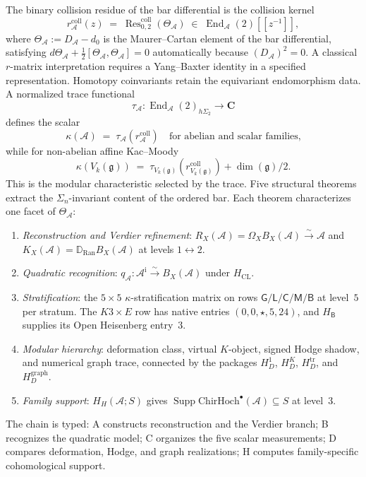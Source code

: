 \documentclass[11pt]{article}
\theoremstyle{plain}
\theoremstyle{definition}
\theoremstyle{remark}
\newcommand{\fg}{\mathfrak{g}}
\newcommand{\Ran}{\mathrm{Ran}}
\newcommand{\cA}{\mathcal{A}}
\newcommand{\Res}{\operatorname{Res}}
\newcommand{\ChirHoch}{\mathrm{ChirHoch}}
\begin{document}
The binary collision residue of the bar differential is the collision
kernel
\[
r^{\mathrm{coll}}_\cA(z) \;=\;
\Res^{\mathrm{coll}}_{0,2}(\Theta_\cA)
\;\in\; \operatorname{End}_\cA(2)[\![z^{-1}]\!],
\]
where $\Theta_\cA := D_\cA - d_0$ is the Maurer--Cartan element
of the bar differential, satisfying
$d\Theta_\cA + \tfrac{1}{2}[\Theta_\cA, \Theta_\cA] = 0$
automatically because $(D_\cA)^2 = 0$.  A classical $r$-matrix
interpretation requires a Yang--Baxter identity in a specified
representation.  Homotopy coinvariants retain the equivariant
endomorphism data.  A normalized trace functional
\[
 \tau_\cA\colon
 \operatorname{End}_\cA(2)_{h\Sigma_2}\longrightarrow\mathbf C
\]
defines the scalar
\begin{equation}\label{eq:kappa-def}
\kappa(\cA) \;=\; \tau_\cA(r^{\mathrm{coll}}_\cA)
\quad \text{for abelian and scalar families,}
\end{equation}
while for non-abelian affine Kac--Moody
\[
\kappa(V_k(\fg))
\;=\;\tau_{V_k(\fg)}(r^{\mathrm{coll}}_{V_k(\fg)})
      +\dim(\fg)/2.
\]
This is the modular characteristic selected by the trace. Five
structural theorems extract the
$\Sigma_n$-invariant content of the ordered bar. Each theorem
characterizes one facet of $\Theta_\cA$:
\begin{enumerate}[label=\textup{(\Alph*)}]
\item \emph{Reconstruction and Verdier refinement}:
 $R_X(\cA)=\Omega_XB_X(\cA)\xrightarrow{\sim}\cA$ and
 $K_X(\cA)=\mathbb D_{\Ran}B_X(\cA)$ at levels
 $1\leftrightarrow2$.
\item \emph{Quadratic recognition}:
 $q_\cA\colon\cA^{\mathrm i}\xrightarrow{\sim}B_X(\cA)$ under
 $H_{\mathrm{CL}}$.
\item \emph{Stratification}: the $5 \times 5$ $\kappa$-stratification
 matrix on rows $\mathsf{G/L/C/M/B}$ at level~$5$ per stratum.  The
 $K3 \times E$ row has native entries $(0,0,\star,5,24)$, and
 $H_{\mathsf B}$ supplies its Open Heisenberg entry~$3$.
\item \emph{Modular hierarchy}: deformation class, virtual
 $K$-object, signed Hodge shadow, and numerical graph trace, connected
 by the packages $H_D^1$, $H_D^K$, $H_D^{\mathrm{tr}}$, and
 $H_D^{\mathrm{graph}}$.
\item \emph{Family support}: $H_H(\cA;S)$ gives
 $\operatorname{Supp}\ChirHoch^\bullet(\cA)\subseteq S$ at level~$3$.
\end{enumerate}

The chain is typed: A constructs reconstruction and the Verdier
branch; B recognizes the quadratic model; C organizes the five
scalar measurements; D compares deformation, Hodge, and graph
realizations; H computes family-specific cohomological support.
\end{document}

